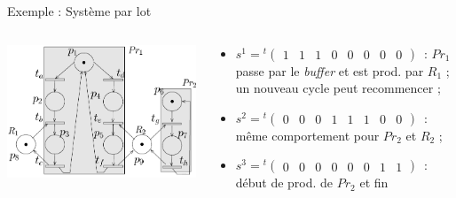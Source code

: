 \documentclass[compress]{beamer}
\begin{document}
\begin{frame}{Exemple : Système par lot}
\begin{columns}
	\begin{column}{.4\linewidth}
	\begin{center}
		\includegraphics[width=\linewidth]{rea1}
	\end{center}
	\end{column}		
	\begin{column}{.65\linewidth}
		\begin{itemize}
		\item $s^1 = {}^t\begin{pmatrix}1&1&1&0&0&0&0&0\end{pmatrix}$~:
		$Pr_1$ passe par le {\em buffer} et est prod. par $R_1$ ; un nouveau cycle peut recommencer ;
		\item $s^2 = {}^t\begin{pmatrix}0&0&0&1&1&1&0&0\end{pmatrix}$~:
		même comportement pour $Pr_2$ et $R_2$ ;
		\item $s^3 = {}^t\begin{pmatrix}0&0&0&0&0&0&1&1\end{pmatrix}$~:
		début de prod. de $Pr_2$ et fin
		\end{itemize} 
	\end{column}
\end{columns}
\end{frame}
\end{document}
